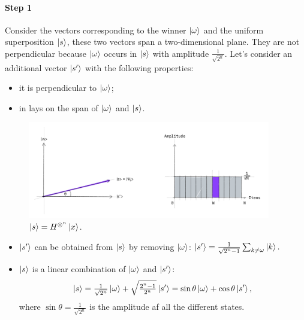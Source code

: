 \documentclass{article}
\begin{document}
\paragraph{Step 1}
Consider the vectors corresponding to the winner $\ket{\omega}$ and the
uniform superposition $\ket{s}$, these two vectors span a two-dimensional plane.
They are not perpendicular because $\ket{\omega}$
occurs in $\ket{s}$ with amplitude $\frac{1}{\sqrt{2^n}}$.
Let's consider an additional vector $\ket{s'}$ with the following
properties:
\begin{itemize}
  \item
  it is perpendicular to $\ket{\omega}$;
  \item
  in lays on the span of $\ket{\omega}$ and $\ket{s}$.
\end{itemize}
\begin{figure}[H]
  \centering
  \includegraphics[width=300pt]{Img/grover-step1.jpg}
  \caption{$\ket{s} = H^{{\otimes}^n} \ket{x}$.}
\end{figure}

\begin{itemize}
  \item
  $\ket{s'}$ can be obtained from $\ket{s}$ by removing $\ket{\omega}$:
  $
    \ket{s'} = \tfrac{1}{\sqrt{2^n-1}} \sum_{k \neq \omega} \ket{k}.
  $
  \item
  $\ket{s}$ is a linear combination of $\ket{\omega}$ and $\ket{s'}$:
  \[
  \ket{s} = \tfrac{1}{\sqrt{2^n}}  \ket{\omega} + \sqrt{\tfrac{2^n-1}{2^n}}
  \ket{s'} = \sin{\theta} \ket{\omega} + \cos{\theta} \ket{s'},
  \]
  where $\sin{\theta} = \tfrac{1}{\sqrt{2^n}}$ is the
  amplitude af all the different states.
\end{itemize}
\end{document}
